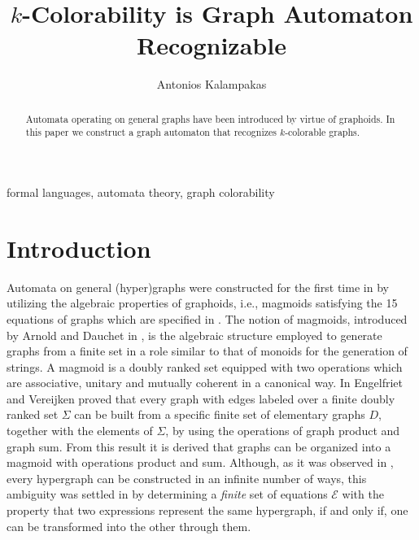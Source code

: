 \documentclass[runningheads,a4paper]{llncs}
\newenvironment{keywords}{
       \list{}{\advance\topsep by0.35cm\relax\small
       \leftmargin=1cm
       \labelwidth=0.35cm
       \listparindent=0.35cm
       \itemindent\listparindent
       \rightmargin\leftmargin}\item[\hskip\labelsep
                                     \bfseries Keywords:]}
     {\endlist}
\begin{document}
\title{$k$-Colorability is Graph Automaton Recognizable}
\author{Antonios Kalampakas}
\maketitle
\begin{abstract}
Automata operating on general graphs have been introduced by virtue of graphoids. In this paper we construct a graph automaton that recognizes $k$-colorable graphs.
\end{abstract}

\begin{keywords}
formal languages, automata theory, graph colorability
\end{keywords}



\section{Introduction}

Automata on general (hyper)graphs were constructed for the first time in \cite{BK3} by utilizing the algebraic properties of graphoids, i.e., magmoids  satisfying the 15 equations of graphs which are specified in \cite{BK1}. The notion of magmoids, introduced by Arnold and Dauchet in \cite{AD}, is the algebraic structure employed to generate graphs from a finite set in a role similar to that of monoids for the generation of strings. A magmoid is a doubly ranked set equipped with two operations which are associative, unitary and mutually coherent in a canonical way. In \cite{EV} Engelfriet and Vereijken proved that every graph with edges labeled  over a finite doubly ranked set $\Sigma$ can be built from a specific finite set of elementary graphs $D$, together with the elements of $\Sigma$, by using the operations of graph product and graph sum. From this result it is derived that graphs can be organized into a magmoid with operations product and sum. Although, as it was observed in \cite{EV}, every hypergraph can be constructed in an infinite number of ways, this ambiguity was settled in \cite{BK1} by determining a \emph{finite} set of equations $\mathcal{E}$ with the property that two expressions represent the same hypergraph, if and only if, one can be transformed into the other
through them.
\end{document}
